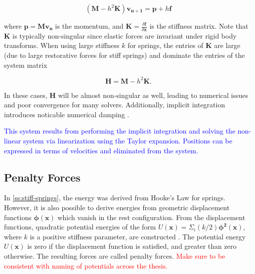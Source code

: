 \[
    (\bm{M} - h^2\bm{K})\bm{v_{n+1}} = \bm{p} + h\bm{f}
\]

where $\bm{p} = \bm{Mv_n}$ is the momentum, and $\bm{K} = \frac{\delta \bm{f}}{\delta \bm{x}}$ is the stiffness matrix. Note that 
$\bm{K}$ is typically non-singular since elastic forces are invariant under rigid body transforms. When using large stiffness 
$k$ for springs, the entries of $\bm{K}$ are large (due to large restorative forces for stiff springs) and dominate the entries 
of the system matrix 

\begin{equation}\label{eq:system-H}
    \bm{H} = \bm{M} - h^2\bm{K}.
\end{equation}

In these cases, $\bm{H}$ will be almost non-singular as well, leading to numerical issues and poor convergence for many solvers. 
Additionally, implicit integration introduces noticable numerical damping \cite{servin2006}.

\textcolor{blue}{This system results from performing the implicit integration and solving the non-linear system via linearization
using the Taylor expansion. Positions can be expressed in terms of velocities and eliminated from the system.}

\subsection{Penalty Forces}\label{ss:penalty-forces}
In \cref{ss:stiff-springs}, the energy was derived from Hooke's Law for springs. However, it is also possible to derive energies from 
geometric displacement functions $\bm{\phi(x)}$ which vanish in the rest configuration. From the displacement functions, quadratic 
potential energies of the form $U(\bm{x}) = \Sigma_i (k / 2) \bm{\phi^2(x)}$, where $k$ is a positive stiffness parameter, are 
constructed \cite{terz1987}. The potential energy $U(\bm{x})$ is zero if the displacement function is satisfied, and greater than 
zero otherwise. The resulting forces are called penalty forces. \textcolor{red}{Make sure to be consistent with naming of potentials
across the thesis.}

